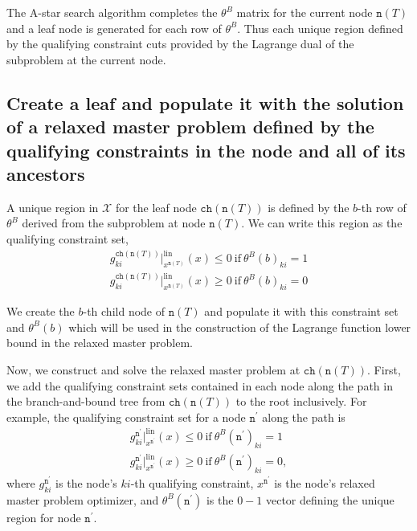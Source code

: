 \documentclass[11pt]{article}
\renewcommand{\leq}{\leqslant}
\renewcommand{\geq}{\geqslant}
\newcommand{\node}{\texttt{n}}
\newcommand{\ch}{\texttt{ch}}
\begin{document}
The A-star search algorithm completes the $\theta^{B}$ matrix for the current node $\node(T)$ and a leaf node is generated for each row of $\theta^{B}$.
Thus each unique region defined by the qualifying constraint cuts provided by the Lagrange dual of the subproblem at the current node.

\subsection{Create a leaf and populate it with the solution of a relaxed master problem defined by the qualifying constraints in the node and all of its ancestors}

A unique region in $\mathcal{X}$ for the leaf node $\texttt{ch}(\texttt{n}(T))$ is defined by the $b$-th row of $\theta^{B}$ derived from the subproblem at node $\node(T)$.
We can write this region as the qualifying constraint set,
\begin{align*}
g^{\ch(\node(T))}_{ki}\big\vert^{\text{lin}}_{x^{\node(T)}}(x) \leq 0\  \text{if}\  \theta^{B}(b)_{ki} = 1\\
g^{\ch(\node(T))}_{ki}\big\vert^{\text{lin}}_{x^{\node(T)}}(x) \geq 0\  \text{if}\  \theta^{B}(b)_{ki} = 0
\end{align*}

We create the $b$-th child node of $\node(T)$ and populate it with this constraint set and $\theta^{B}(b)$ which will be used in the construction of the Lagrange function lower bound in the relaxed master problem.

Now, we construct and solve the relaxed master problem at $\ch(\node(T))$. 
First, we add the qualifying constraint sets contained in each node along the path in the branch-and-bound tree from $\ch(\node(T))$ to the root inclusively.
For example, the qualifying constraint set for a node $\node^\prime$ along the path is
\begin{align*}
g^{\node^\prime}_{ki}\big\vert^{\text{lin}}_{x^{\node^\prime}}(x) \leq 0\  \text{if}\  \theta^{B}(\node^\prime)_{ki} = 1\\
g^{\node^\prime}_{ki}\big\vert^{\text{lin}}_{x^{\node^\prime}}(x) \geq 0\  \text{if}\  \theta^{B}(\node^\prime)_{ki} = 0,
\end{align*}
where $g^{\node^\prime}_{ki}$ is the node's $ki$-th qualifying constraint, $x^{\node^\prime}$ is the node's relaxed master problem optimizer, and $\theta^{B}(\node^\prime)$ is the $0-1$ vector defining the unique region for node $\node^\prime$.
\end{document}
